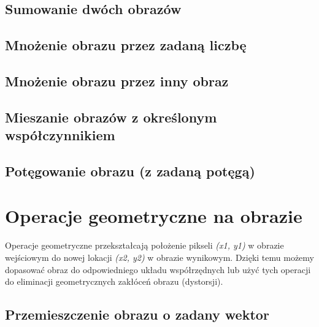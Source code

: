 \documentclass[a4paper,12pt]{book}
\begin{document}
\section{Sumowanie dwóch obrazów}
\section{Mnożenie obrazu przez zadaną liczbę}
\section{Mnożenie obrazu przez inny obraz}
\section{Mieszanie obrazów z określonym współczynnikiem}
\section{Potęgowanie obrazu (z zadaną potęgą)}

\chapter{Operacje geometryczne na obrazie}
Operacje geometryczne przekształcają położenie pikseli \textit{(x1, y1)} w obrazie wejściowym do nowej lokacji \textit{(x2, y2)} w obrazie wynikowym. Dzięki temu możemy dopasować obraz do odpowiedniego układu współrzędnych lub użyć tych operacji do eliminacji geometrycznych zakłóceń obrazu (dystorsji). 
\section{Przemieszczenie obrazu o zadany wektor}
\end{document}
